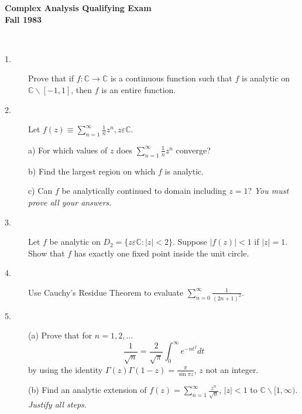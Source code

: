 \documentclass{article}
\def\C{\mathbb C}
\begin{document}






\begin{center}\begin{LARGE}
{\bf Complex Analysis Qualifying Exam}\\ 
{\bf Fall 1983}\\ \end{LARGE}
\end{center}
\vspace{0.1in}
\noindent\hrulefill\\

\begin{description}
\item[1.]
Prove that if $f : \C \to \C$ is a continuous function such that $f$ is
analytic on $\C \backslash [-1,1]$, then $f$ is an entire function.

\item[2.]
Let $f(z) \equiv \sum^\infty_{n=1} \frac{1}{n} z^n, z \varepsilon \C$.

\item[\quad] a)
For which values of $z$ does $\sum^\infty_{n=1} \frac{1}{n} z^n$ converge?

\item[\quad] b)
Find the largest region on which $f$ is analytic.

\item[\quad] c)
Can $f$ be analytically continued to domain including $z=1$? {\it You must
prove all your answers}.

\item[3.]
Let $f$ be analytic on $D_2 = \{z \varepsilon \C : |z| < 2\}$. Suppose
$|f(z)| < 1$ if $|z| = 1$. Show that $f$ has exactly one fixed point
inside the unit circle.

\item[4.]
Use Cauchy's Residue Theorem to evaluate
$\sum^\infty_{n=0} \frac{1}{(2n + 1)^2}$.

\item[5.] (a)
Prove that for $n = 1,2, \dots$
$$\frac{1}{\sqrt{n}} = \frac{2}{\sqrt{\pi}} \int^\infty_0 e^{-nt^2} dt$$
by using the identity $\Gamma (z) \Gamma (1-z) = \frac{\pi}{\sin \pi z}$,
$z$ not an integer.

\item[\quad] (b)
Find an analytic extension of
$f(z) = \sum^\infty_{n=1} \frac{z^n}{\sqrt{n}}$,
$|z| < 1$  to $\C \backslash [1, \infty)$. {\it Justify all steps.}


\end{description}
\end{document}
